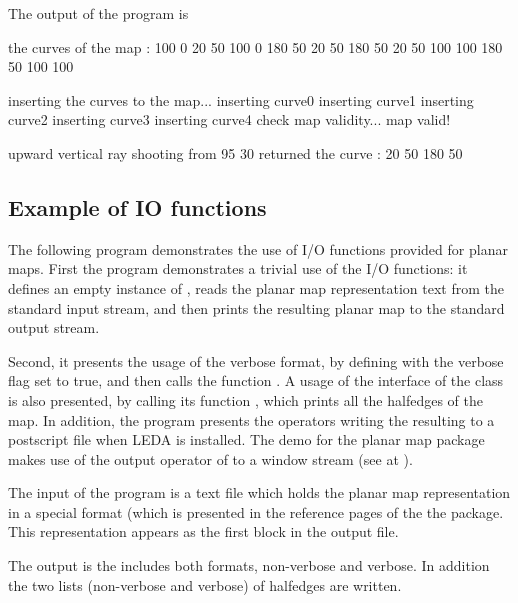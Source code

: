 The output of the program is

\begin{ccExampleCode}
the curves of the map :
100 0 20 50
100 0 180 50
20 50 180 50
20 50 100 100
180 50 100 100

inserting the curves to the map...
inserting curve0
inserting curve1
inserting curve2
inserting curve3
inserting curve4
check map validity... map valid!

upward vertical ray shooting from 95 30
returned the curve : 20 50 180 50

\end{ccExampleCode}

\subsection{Example of IO functions}
\label{PM_sec:example9}

The following program demonstrates the use of I/O functions provided
for planar maps. 
First the program demonstrates a trivial use of the I/O functions: 
it defines an empty instance of , 
reads the planar map representation text from the standard input stream, 
and then prints the resulting planar map to the standard output stream.

Second, it presents the usage of the verbose format, 
by defining  with the verbose flag set to true, 
and then calls the function .
A usage of the interface of the class  is also
presented, by calling its function , which
prints all the halfedges of the map. In addition, the program presents
the operators writing the resulting   to a postscript
file when LEDA is installed. The demo for the planar map package makes
use of the output operator of  to a
window stream  (see at  ).   



The input of the program is a text file which holds the planar map
representation in a special format (which is presented in the
reference pages of the the  package.
This representation appears as the first block in the output file.
 

The output is the  includes both formats, non-verbose
and verbose. In addition the two lists (non-verbose and verbose) of
halfedges are written.
